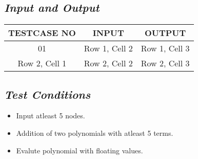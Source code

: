 \documentclass{article}
\begin{document}
\subsection{\textbf{\textit{Input and Output}}}
\begin{tabular} {|c|c|c|}
    \toprule
    \textbf{TESTCASE NO} & \textbf{INPUT} & \textbf{OUTPUT} \\
    \midrule
    01 & Row 1, Cell 2 & Row 1, Cell 3 \\
    \midrule
    Row 2, Cell 1 & Row 2, Cell 2 & Row 2, Cell 3 \\
    \bottomrule 
\end{tabular}
\subsection{\textbf{\textit{Test Conditions}}}
\begin{itemize}
    \item Input atleast 5 nodes.
    \item Addition of two polynomials with atleast 5 terms.
    \item Evalute polynomial with floating values.
\end{itemize}
\pagebreak
\end{document}
